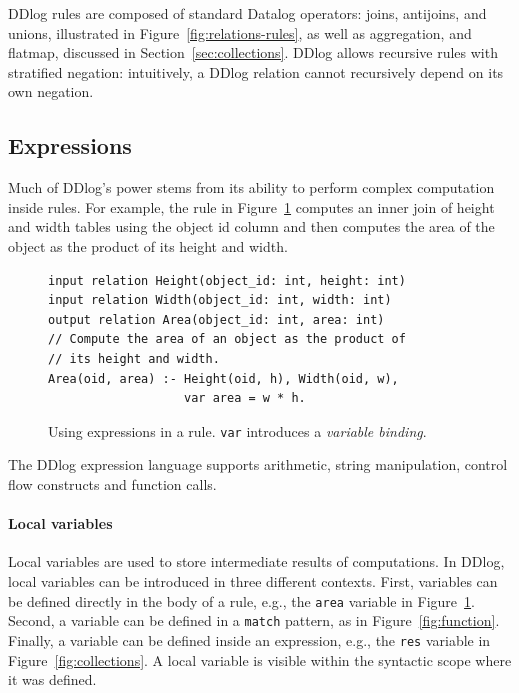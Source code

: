 DDlog rules are composed of standard Datalog operators: joins, antijoins, and
unions, illustrated in Figure~\ref{fig:relations-rules}, as
well as aggregation, and flatmap, discussed in Section~\ref{sec:collections}.
DDlog allows recursive rules with stratified negation: intuitively, a DDlog
relation cannot recursively depend on its own negation.

\subsection{Expressions}

Much of DDlog's power stems from its ability to perform complex computation
inside rules.  For example, the rule in Figure~\ref{fig:area} computes
an inner join of height and width tables using the object id column and
then computes the area of the object as the product of its height and width.

\begin{figure}[t]
  \footnotesize
  \begin{lstlisting}[language=ddlog]
input relation Height(object_id: int, height: int)
input relation Width(object_id: int, width: int)
output relation Area(object_id: int, area: int)
// Compute the area of an object as the product of
// its height and width.
Area(oid, area) :- Height(oid, h), Width(oid, w),
                   var area = w * h.
  \end{lstlisting}
  \caption{Using expressions in a rule.  \texttt{var} introduces a
    \emph{variable binding}.\label{fig:area}}
\end{figure}

The DDlog expression language supports arithmetic, string
manipulation, control flow constructs and function calls.

\paragraph{Local variables}
Local variables are used to store intermediate results of
computations.  In DDlog, local variables can be introduced in three
different contexts.  First, variables can be defined directly in the
body of a rule, e.g., the \texttt{area} variable in
Figure~\ref{fig:area}.  Second, a variable can be defined in a
\texttt{match} pattern, as in Figure~\ref{fig:function}.  Finally, a
variable can be defined inside an expression, e.g., the \texttt{res}
variable in Figure~\ref{fig:collections}.  A local variable is visible
within the syntactic scope where it was defined.

